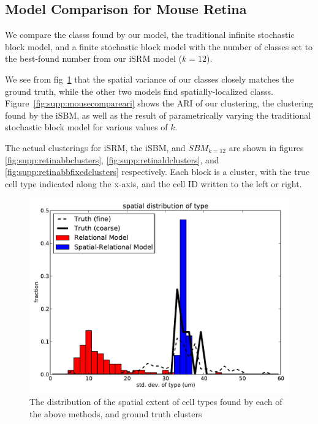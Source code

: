 \documentclass{article}
\begin{document}
\FloatBarrier
\subsection{Model Comparison for Mouse Retina}

We compare the classs found by our model, the traditional infinite
stochastic block model, and a finite stochastic block model with the number
of classes set to the best-found number from our iSRM model ($k=12$).

We see from fig~\ref{fig:supp:irmspatialcomparemouse} that the spatial
variance of our classes closely matches the ground truth, while the
other two models find spatially-localized
classs. Figure~\ref{fig:supp:mousecompareari} shows the ARI of our
clustering, the clustering found by the iSBM,
as well as the result of parametrically varying the traditional stochastic
block model for various values of $k$. 

The actual clusterings for iSRM, the iSBM, and $SBM_{k=12}$ are shown
in figures \ref{fig:supp:retinabbclusters},
\ref{fig:supp:retinaldclusters}, and
\ref{fig:supp:retinabbfixedclusters} respectively. Each block is a
cluster, with the true cell type indicated along the x-axis, and the
cell ID written to the left or right.


\begin{figure}[h!]
  \centering 
    \centerline{\includegraphics[width=5in]{mouseretina/spatial_var.pdf}}
  \caption{The distribution of the spatial extent of cell types found by each of
the above methods, and ground truth clusters}
\label{fig:supp:irmspatialcomparemouse}
\end{figure}
\end{document}
